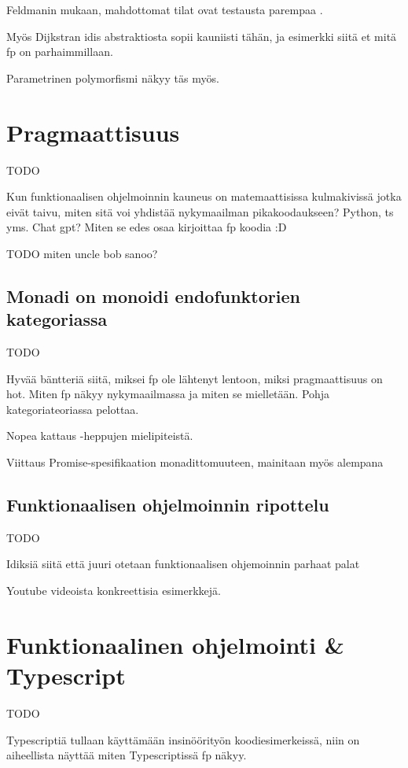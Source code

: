 Feldmanin mukaan, mahdottomat tilat ovat testausta parempaa \cite{impossiblebetter}.

Myös Dijkstran idis abstraktiosta sopii kauniisti tähän, ja esimerkki siitä et mitä \gls{fp} on parhaimmillaan.

Parametrinen polymorfismi näkyy täs myös.

\section{Pragmaattisuus}

TODO

Kun funktionaalisen ohjelmoinnin kauneus on matemaattisissa kulmakivissä jotka eivät taivu, miten sitä voi yhdistää nykymaailman pikakoodaukseen? Python, \gls{ts} yms. Chat gpt? Miten se edes osaa kirjoittaa fp koodia :D

TODO miten uncle bob sanoo? \cite{martin2017pragmaticfp}

\subsection{Monadi on monoidi endofunktorien kategoriassa}

TODO

Hyvää bäntteriä siitä, miksei fp ole lähtenyt lentoon, miksi pragmaattisuus on hot. Miten fp näkyy nykymaailmassa ja miten se mielletään. Pohja kategoriateoriassa pelottaa.

Nopea kattaus  -heppujen mielipiteistä.

Viittaus Promise-spesifikaation monadittomuuteen, mainitaan myös alempana

\subsection{Funktionaalisen ohjelmoinnin ripottelu}

TODO

Idiksiä siitä että juuri otetaan funktionaalisen ohjemoinnin parhaat palat

Youtube videoista konkreettisia esimerkkejä.

\section{Funktionaalinen ohjelmointi \& Typescript}


TODO

Typescriptiä tullaan käyttämään insinöörityön koodiesimerkeissä, niin on aiheellista näyttää miten Typescriptissä \gls{fp} näkyy.

